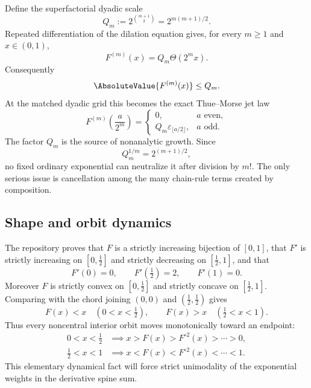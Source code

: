 \documentclass[11pt,oneside]{article}
\theoremstyle{definition}
\theoremstyle{remark}
\newcommand{\eps}{\varepsilon}
\newcommand{\comp}{\mathbin{\circ}}
\newcommand{\ThetaF}{\Theta}
\newcommand{\half}{\tfrac12}
\begin{document}
Define the superfactorial dyadic scale
\begin{equation}
  Q_m:=2^{\binom{m+1}{2}}=2^{m(m+1)/2}.
  \label{eq:Qm}
\end{equation}
Repeated differentiation of the dilation equation gives, for every $m\geq1$ and
$x\in(0,1)$,
\begin{equation}
  F^{(m)}(x)=Q_m\ThetaF(2^m x).
  \label{eq:derivative-atlas}
\end{equation}
Consequently
\begin{equation}
  \AbsoluteValue{F^{(m)}(x)}\leq Q_m.
  \label{eq:F-derivative-bound}
\end{equation}
At the matched dyadic grid this becomes the exact Thue--Morse jet law
\begin{equation}
 F^{(m)}\!\left(\frac{a}{2^m}\right)
 =\begin{cases}
 0,&a\text{ even},\\
 Q_m\eps_{\lfloor a/2\rfloor},&a\text{ odd}.
 \end{cases}
 \label{eq:dyadic-jet}
\end{equation}
The factor $Q_m$ is the source of nonanalytic growth.  Since
\begin{equation}
  Q_m^{1/m}=2^{(m+1)/2},
  \label{eq:Q-root}
\end{equation}
no fixed ordinary exponential can neutralize it after division by $m!$.
The only serious issue is cancellation among the many chain-rule terms created by
composition.

\subsection{Shape and orbit dynamics}

The repository proves that $F$ is a strictly increasing bijection of $[0,1]$, that
$F'$ is strictly increasing on $[0,\half]$ and strictly decreasing on
$[\half,1]$, and that
\begin{equation}
 F'(0)=0,\qquad F'(\half)=2,\qquad F'(1)=0.
 \label{eq:slope-values}
\end{equation}
Moreover $F$ is strictly convex on $[0,\half]$ and strictly concave on
$[\half,1]$.  Comparing with the chord joining $(0,0)$ and $(\half,\half)$ gives
\begin{equation}
  F(x)<x\quad(0<x<\half),
  \qquad
  F(x)>x\quad(\half<x<1).
  \label{eq:drift}
\end{equation}
Thus every noncentral interior orbit moves monotonically toward an endpoint:
\begin{align}
 0<x<\half&\implies x>F(x)>F^{\comp2}(x)>\cdots>0,
 \label{eq:left-orbit}\\
 \half<x<1&\implies x<F(x)<F^{\comp2}(x)<\cdots<1.
 \label{eq:right-orbit}
\end{align}
This elementary dynamical fact will force strict unimodality of the exponential
weights in the derivative spine sum.
\end{document}

